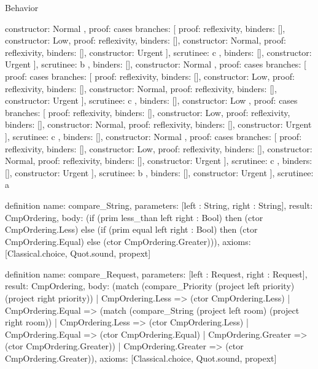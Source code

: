\begin{lexlean}{Behavior}
\begin{semanticmodule}
{{{{{              constructor: Normal
            },
            {
              proof: cases{
                branches: [
                  {proof: reflexivity{}, binders: [], constructor: Low},
                  {proof: reflexivity{}, binders: [], constructor: Normal},
                  {proof: reflexivity{}, binders: [], constructor: Urgent}
                ],
                scrutinee: c
              },
              binders: [],
              constructor: Urgent
            }
          ],
          scrutinee: b
        },
        binders: [],
        constructor: Normal
      },
      {
        proof: cases{
          branches: [
            {
              proof: cases{
                branches: [
                  {proof: reflexivity{}, binders: [], constructor: Low},
                  {proof: reflexivity{}, binders: [], constructor: Normal},
                  {proof: reflexivity{}, binders: [], constructor: Urgent}
                ],
                scrutinee: c
              },
              binders: [],
              constructor: Low
            },
            {
              proof: cases{
                branches: [
                  {proof: reflexivity{}, binders: [], constructor: Low},
                  {proof: reflexivity{}, binders: [], constructor: Normal},
                  {proof: reflexivity{}, binders: [], constructor: Urgent}
                ],
                scrutinee: c
              },
              binders: [],
              constructor: Normal
            },
            {
              proof: cases{
                branches: [
                  {proof: reflexivity{}, binders: [], constructor: Low},
                  {proof: reflexivity{}, binders: [], constructor: Normal},
                  {proof: reflexivity{}, binders: [], constructor: Urgent}
                ],
                scrutinee: c
              },
              binders: [],
              constructor: Urgent
            }
          ],
          scrutinee: b
        },
        binders: [],
        constructor: Urgent
      }
    ],
    scrutinee: a
  }
}

definition{
  name: compare_String,
  parameters: [left : String, right : String],
  result: CmpOrdering,
  body: (if (prim less_than left right : Bool) then (ctor CmpOrdering.Less) else (if (prim equal left right : Bool) then (ctor CmpOrdering.Equal) else (ctor CmpOrdering.Greater))),
  axioms: [Classical.choice, Quot.sound, propext]
}

definition{
  name: compare_Request,
  parameters: [left : Request, right : Request],
  result: CmpOrdering,
  body: (match (compare_Priority (project left priority) (project right priority))
    | CmpOrdering.Less => (ctor CmpOrdering.Less)
    | CmpOrdering.Equal => (match (compare_String (project left room) (project right room))
      | CmpOrdering.Less => (ctor CmpOrdering.Less)
      | CmpOrdering.Equal => (ctor CmpOrdering.Equal)
      | CmpOrdering.Greater => (ctor CmpOrdering.Greater))
    | CmpOrdering.Greater => (ctor CmpOrdering.Greater)),
  axioms: [Classical.choice, Quot.sound, propext]
}


\end{semanticmodule}
\end{lexlean}
